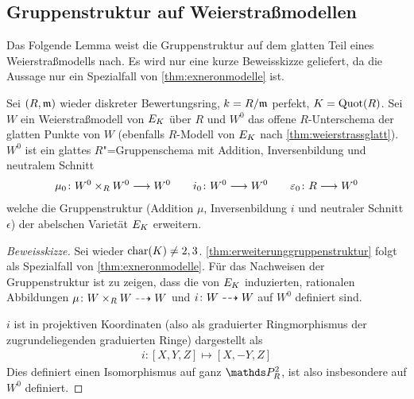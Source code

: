 \subsection{Gruppenstruktur auf Weierstraßmodellen}
Das Folgende Lemma weist die Gruppenstruktur auf dem glatten Teil
eines Weierstraßmodells nach. Es wird nur eine kurze Beweisskizze
geliefert, da die Aussage nur ein Spezialfall von
\ref{thm:exneronmodelle} ist.
\begin{Lemma}\label{thm:erweiterunggruppenstruktur}
  Sei $(R,\mathfrak{m})$ wieder diskreter Bewertungsring,
  $k=R/\mathfrak{m}$ perfekt,
  $K=\operatorname{Quot}(R)$.
  Sei $W$ ein Weierstraßmodell von $E_{K}$ über $R$ und
  $W^0$ das offene $R$-Unterschema der glatten Punkte von $W$ 
  (ebenfalls $R$-Modell von $E_{K}$ nach \ref{thm:weierstrassglatt}).
  $W^0$ ist ein glattes $R$"=Gruppenschema
  mit Addition, Inversenbildung und neutralem Schnitt
  \begin{gather*}
    \mu_0\colon W^0\times_R W^0 \longrightarrow W^0
    \qquad
    i_0\colon W^0\longrightarrow W^0
    \qquad
    \varepsilon_0\colon R\longrightarrow W^0
  \end{gather*}
  welche die Gruppenstruktur (Addition $\mu$, Inversenbildung $i$ und
  neutraler Schnitt $\epsilon$)
  der abelschen Varietät $E_{K}$ erweitern.

  
  \begin{proof}[Beweisskizze] Sei wieder $\operatorname{char}(K)\neq 2,3$.
    \ref{thm:erweiterunggruppenstruktur} folgt als Spezialfall von
    \ref{thm:exneronmodelle}.
    Für das Nachweisen der Gruppenstruktur ist zu zeigen, dass die von
    $E_{K}$ induzierten, rationalen Abbildungen $\mu\colon W\times_R
    W\dashrightarrow W$ und $i\colon W\dashrightarrow W$ auf $W^0$ definiert sind.

    $i$ ist in projektiven Koordinaten (also als graduierter
    Ringmorphismus der zugrundeliegenden graduierten Ringe)
    dargestellt als
    \begin{gather*}
      i\colon [X,Y,Z]\mapsto [X,-Y,Z]
    \end{gather*}
    Dies definiert einen Isomorphismus auf ganz $\P_R^2$, ist also
    insbesondere auf $W^0$ definiert.


\end{proof}
\end{Lemma}
